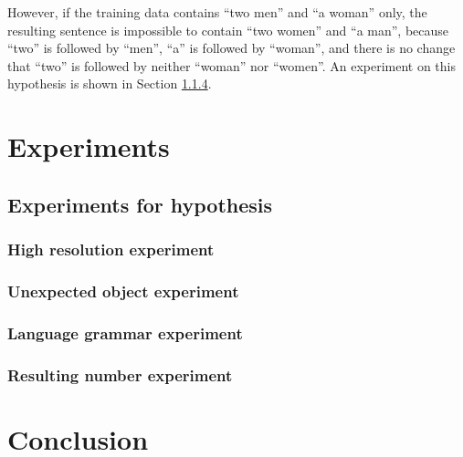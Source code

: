 \documentclass[10pt,twocolumn,letterpaper]{article}
\begin{document}
However, if the training data contains ``two men'' and ``a woman'' only,
the resulting sentence is impossible to contain ``two women'' and ``a man'',
because ``two'' is followed by ``men'', ``a'' is followed by ``woman'',
and there is no change that ``two'' is followed by neither ``woman'' nor ``women''.
An experiment on this hypothesis is shown in Section \ref{sec:rn}.


\section{Experiments}



\subsection{Experiments for hypothesis}
\subsubsection{High resolution experiment} \label{sec:hs}

\subsubsection{Unexpected object experiment} \label{sec:uo}

\subsubsection{Language grammar experiment} \label{sec:lg}


\subsubsection{Resulting number experiment} \label{sec:rn}


\section{Conclusion}
\end{document}
